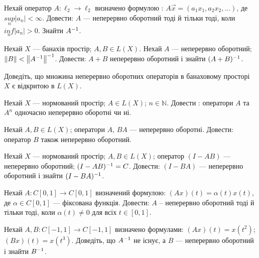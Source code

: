 \begin{exercise}
    Нехай оператор $A: \ell_2 \rightarrow \ell_2$ визначено формулою : 
    $A\vec{x} = (a_1x_1, a_2x_2, ...)$, де $\underset{n}{sup}|a_n| < \infty$. Довести: 
    $A$ --- неперервно оборотний тоді й тільки тоді, коли $\underset{n}{inf}|a_n| > 0$. 
    Знайти $A^{-1}$.
\end{exercise}

\begin{exercise}
    Нехай $X$ --- банахів простір; $A, B \in L(X)$. Нехай $A$ --- неперервно оборотний; 
    $\left\lVert B\right\rVert < \left\lVert A^{-1}\right\rVert^{-1}$. Довести: $A + B$ неперервно оборотний і знайти 
    $(A+B)^{-1}$.
\end{exercise}

\begin{exercise}
    Доведіть, що множина неперервно оборотних операторів в банаховому просторі $X$ є відкритою 
    в $L(X)$. 
\end{exercise}

\begin{exercise}
    Нехай $X$ --- нормований простір; $A \in L(X)$; $n \in \mathbb{N}$. Довести : оператори 
    $A$ та $A^n$ одночасно неперервно оборотні чи ні.
\end{exercise}

\begin{exercise}
    Нехай $A, B \in L(X)$; оператори $A$, $BA$ --- неперервно оборотні. Довести: оператор 
    $B$ також неперервно оборотний.
\end{exercise}

\begin{exercise}
    Нехай $X$ --- нормований простір; $A, B \in L(X)$; оператор $(I - AB)$ --- неперервно 
    оборотний; $(I - AB)^{-1} = C$. Довести: $(I - BA)$ --- неперервно оборотний і знайти 
    $(I - BA)^{-1}$.
\end{exercise}

\begin{exercise}
    Нехай $A: C[0, 1] \rightarrow C[0, 1]$ визначений формулою: $(Ax)(t) = \alpha(t)x(t)$, 
    де $\alpha \in C[0, 1]$ --- фіксована функція. Довести: $A$ -- неперервно оборотний 
    тоді й тільки тоді, коли $\alpha(t) \neq 0$ для всіх $t \in [0, 1]$. 
\end{exercise}

\begin{exercise}
    Нехай $A, B : C[-1, 1] \rightarrow C[-1, 1]$ визначено формулами: $(Ax)(t) = 
    x(t^2)$; $(Bx)(t) = x(t^3)$. Доведіть, що $A^{-1}$ не існує, а $B$ --- неперервно 
    оборотний і знайти $B^{-1}$.
\end{exercise}